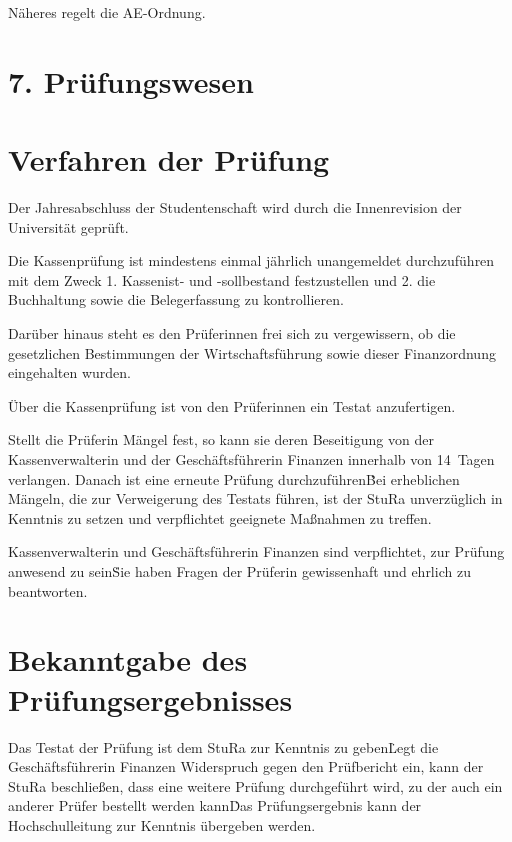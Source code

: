 \begin{multicols}{2}
\Abs \Satz Näheres regelt die AE-Ordnung. 


\section*{7. Prüfungswesen}



\section{Verfahren der Prüfung}

\Abs \Satz Der Jahresabschluss der Studentenschaft wird durch die Innenrevision der Universität geprüft.

\Abs \Satz Die Kassenprüfung ist mindestens einmal jährlich unangemeldet durchzuführen mit dem Zweck
1. Kassenist- und -sollbestand festzustellen und
2. die Buchhaltung sowie die Belegerfassung zu kontrollieren.

\Abs \Satz Darüber hinaus steht es den Prüferinnen frei sich zu vergewissern, ob die gesetzlichen Bestimmungen der Wirtschaftsführung sowie dieser Finanzordnung eingehalten wurden.

\Abs \Satz Über die Kassenprüfung ist von den Prüferinnen ein Testat anzufertigen.

\Abs \Satz Stellt die Prüferin Mängel fest, so kann sie deren Beseitigung von der Kassenverwalterin und der Geschäftsführerin Finanzen innerhalb von 14~Tagen verlangen. Danach ist eine erneute Prüfung durchzuführen\. Bei erheblichen Mängeln, die zur Verweigerung des Testats führen, ist der StuRa unverzüglich in Kenntnis zu setzen und verpflichtet geeignete Maßnahmen zu treffen.

\Abs \Satz Kassenverwalterin und Geschäftsführerin Finanzen sind verpflichtet, zur Prüfung anwesend zu sein\. Sie haben Fragen der Prüferin gewissenhaft und ehrlich zu beantworten.



\section{Bekanntgabe des Prüfungsergebnisses}

\Abs \Satz Das Testat der Prüfung ist dem StuRa zur Kenntnis zu geben\. Legt die Geschäftsführerin Finanzen Widerspruch gegen den Prüfbericht ein, kann der StuRa beschließen, dass eine weitere Prüfung durchgeführt wird, zu der auch ein anderer Prüfer bestellt werden kann\. Das Prüfungsergebnis kann der Hochschulleitung zur Kenntnis übergeben werden.




\end{multicols}
